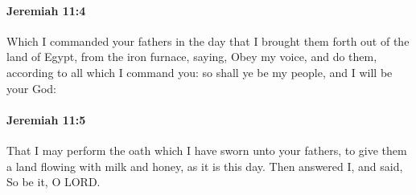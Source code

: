 		\paragraph{Jeremiah 11:4} %
			\label{JEREMIAH-11-4}

			Which I commanded your fathers in the day that I brought them forth out of the land of Egypt, from the iron furnace, saying, Obey my voice, and do them, according to all which I command you: so shall ye be my people, and I will be your God:


		\paragraph{Jeremiah 11:5} %
			\label{JEREMIAH-11-5}

			That I may perform the oath which I have sworn unto your fathers, to give them a land flowing with milk and honey, as it is this day. Then answered I, and said, So be it, O LORD.

